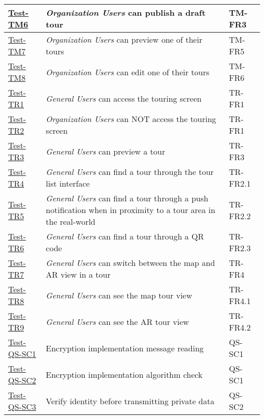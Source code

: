 \documentclass[12pt, titlepage]{article}
\begin{document}
\begin{table}[h!]
\begin{tabular}{|l|l|l|}
        \hline
        \hyperref[itm:Test-TM6]{Test-TM6} & \textit{Organization Users} can publish a draft tour & TM-FR3 \\
        \hline
        \hyperref[itm:Test-TM7]{Test-TM7} & \textit{Organization Users} can preview one of their tours & TM-FR5 \\
        \hline
        \hyperref[itm:Test-TM8]{Test-TM8} & \textit{Organization Users} can edit one of their tours & TM-FR6 \\
        \hline
        \hyperref[itm:Test-TR1]{Test-TR1} & \textit{General Users} can access the touring screen & TR-FR1 \\
        \hline
        \hyperref[itm:Test-TR2]{Test-TR2} & \textit{Organization Users} can NOT access the touring screen & TR-FR1 \\
        \hline
        \hyperref[itm:Test-TR3]{Test-TR3} & \textit{General Users} can preview a tour & TR-FR3 \\
        \hline
        \hyperref[itm:Test-TR4]{Test-TR4} & \textit{General Users} can find a tour through the tour list interface & TR-FR2.1 \\
        \hline
        \hyperref[itm:Test-TR5]{Test-TR5} & \textit{General Users} can find a tour through a push notification when in proximity to a tour area in the real-world & TR-FR2.2 \\
        \hline
        \hyperref[itm:Test-TR6]{Test-TR6} & \textit{General Users} can find a tour through a QR code & TR-FR2.3 \\
        \hline
        \hyperref[itm:Test-TR7]{Test-TR7} & \textit{General Users} can switch between the map and AR view in a tour & TR-FR4 \\
        \hline
        \hyperref[itm:Test-TR8]{Test-TR8} & \textit{General Users} can see the map tour view \label{itm:Test-TR8} & TR-FR4.1 \\
        \hline
        \hyperref[itm:Test-TR9]{Test-TR9} & \textit{General Users} can see the AR tour view & TR-FR4.2 \\
        \hline
        \hyperref[itm:Test-QS-SC1]{Test-QS-SC1} & Encryption implementation message reading & QS-SC1 \\
        \hline
        \hyperref[itm:Test-QS-SC2]{Test-QS-SC2} & Encryption implementation algorithm check & QS-SC1 \\
        \hline
        \hyperref[itm:Test-QS-SC3]{Test-QS-SC3} & Verify identity before transmitting private data & QS-SC2 \\
        \hline

\end{tabular}
\end{table}
\end{document}
